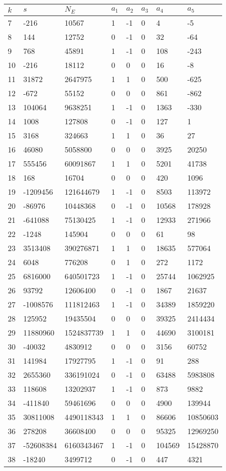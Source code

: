 \documentclass{amsart}
\begin{document}
\begin{longtable}{|l|l|l|lllll|}
\hline
$k$ & $s$ & $N_E$ & $a_1$ & $a_2$ & $a_3$ & $a_4$ & $a_5$\\
\hline
7&-216&10567&1&-1&0&4&-5\\
8&144&12752&0&-1&0&32&-64\\
9&768&45891&1&-1&0&108&-243\\
10&-216&18112&0&0&0&16&-8\\
11&31872&2647975&1&1&0&500&-625\\
12&-672&55152&0&0&0&861&-862\\
13&104064&9638251&1&-1&0&1363&-330\\
14&1008&127808&0&-1&0&127&1\\
15&3168&324663&1&1&0&36&27\\
16&46080&5058800&0&0&0&3925&20250\\
17&555456&60091867&1&1&0&5201&41738\\
18&168&16704&0&0&0&420&1096\\
19&-1209456&121644679&1&-1&0&8503&113972\\
20&-86976&10448368&0&-1&0&10568&178928\\
21&-641088&75130425&1&-1&0&12933&271966\\
22&-1248&145904&0&0&0&61&98\\
23&3513408&390276871&1&1&0&18635&577064\\
24&6048&776208&0&1&0&272&1172\\
25&6816000&640501723&1&-1&0&25744&1062925\\
26&93792&12606400&0&-1&0&1867&21637\\
27&-1008576&111812463&1&-1&0&34389&1859220\\
28&125952&19435504&0&0&0&39325&2414434\\
29&11880960&1524837739&1&1&0&44690&3100181\\
30&-40032&4830912&0&0&0&3156&60752\\
31&141984&17927795&1&-1&0&91&288\\
32&2655360&336191024&0&-1&0&63488&5983808\\
33&118608&13202937&1&-1&0&873&9882\\
34&-411840&59461696&0&0&0&4900&139944\\
35&30811008&4490118343&1&1&0&86606&10850603\\
36&278208&36608400&0&0&0&95325&12969250\\
37&-52608384&6160343467&1&-1&0&104569&15428870\\
38&-18240&3499712&0&-1&0&447&4321\\

\end{longtable}
\end{document}
